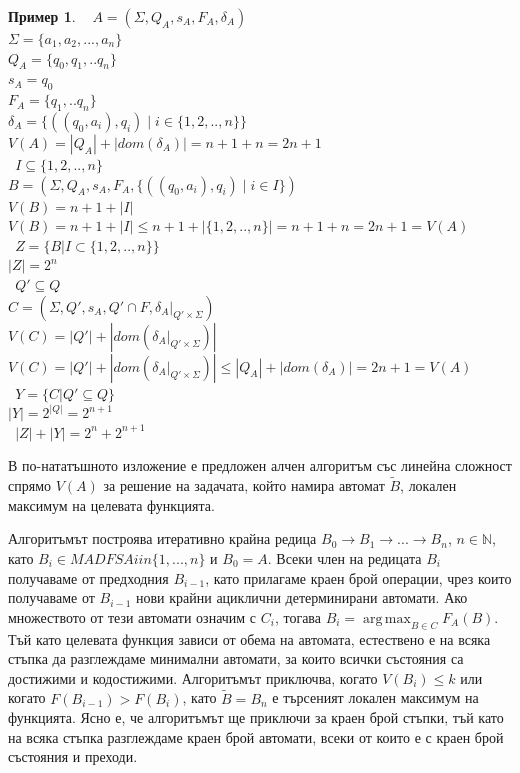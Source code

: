 \documentclass[a4paper,12pt]{article}
\newtheorem{example}{Пример}[section]
\DeclareMathOperator*{\argmax}{arg\,max}
\begin{document}
  \begin{example}
  \hfill \break\ \hfill \break
  $ A = (\Sigma, Q_A, s_A, F_A, \delta_A) $ \\
  $ \Sigma = \{ a_1, a_2, ..., a_n \} $ \\
  $ Q_A = \{ q_0, q_1, .. q_n \} $ \\
  $ s_A = q_0 $ \\
  $ F_A = \{ q_1, .. q_n \} $ \\
  $ \delta_A = \{ ((q_0, a_i), q_i)\;|\;i \in \{ 1, 2, .. , n \} \} $ \\
  $ V(A) = |Q_A| + | dom(\delta_A) | = n + 1 + n = 2n + 1 $ \\
  \hfill \break\
  $ I \subseteq \{ 1, 2, .. , n \} $ \\
  $ B = ( \Sigma, Q_A, s_A, F_A, \{ ((q_0, a_i), q_i)\;|\;i \in I \} ) $ \\
  $ V(B) = n + 1 + |I| $ \\
  $ V(B) = n + 1 + |I| \leq n + 1 + |\{ 1, 2, .. , n \}| = n + 1 + n = 2n + 1 = V(A) $ \\
  \hfill \break\
  $ Z = \{ B | I \subset \{ 1, 2, .. , n \} \} $ \\
  $ |Z| = 2^n $ \\
  \hfill \break\
  $ Q' \subseteq Q $ \\
  $ C = ( \Sigma, Q', s_A, Q' \cap F, \left.{\delta_A}\right|_{Q' \times \Sigma} ) $ \\
  $ V(C) = |Q'| + |dom(\left.{\delta_A}\right|_{Q' \times \Sigma})| $ \\
  $ V(C) = |Q'| + |dom(\left.{\delta_A}\right|_{Q' \times \Sigma})| \leq |Q_A| + |dom(\delta_A)| = 2n + 1 = V(A) $ \\
  \hfill \break\
  $ Y = \{ C | Q' \subseteq Q \} $ \\
  $ |Y| = 2^{|Q|} = 2 ^ {n + 1} $ \\
  \hfill \break\
  $ |Z| + |Y| = 2^n + 2 ^ {n+1} $
  \end{example}

\bigskip

  В по-нататъшното изложение е предложен алчен алгоритъм със линейна сложност спрямо $V(A)$ за решение на задачата, който намира автомат $\widetilde{B}$,
  локален максимум на целевата функцията.

  Алгоритъмът построява итеративно крайна редица $B_0 \rightarrow B_1 \rightarrow ... \rightarrow B_n$, $n \in \mathbb N$, като
  $B_i \in MADFSA i in \{1, ..., n\}$ и $B_0 = A$.
  Всеки член на редицата $B_i$ получаваме от предходния $B_{i-1}$, като
  прилагаме краен брой операции, чрез които получаваме от $B_{i-1}$ нови крайни ациклични детерминирани автомати. Ако множеството от тези автомати означим с $C_i$,
  тогава $B_i = \argmax_{B \in C} F_A(B)$. Тъй като целевата функция зависи от обема на автомата, естествено е на всяка стъпка да разглеждаме минимални
  автомати, за които всички състояния са достижими и кодостижими. Алгоритъмът приключва, когато $V(B_i) \leq k$ или когато $F(B_{i-1}) > F(B_i)$, като
  $\widetilde{B} = B_n$ е търсеният локален максимум на функцията. Ясно е, че алгоритъмът ще приключи за краен брой стъпки, тъй като на всяка стъпка разглеждаме
  краен брой автомати, всеки от които е с краен брой състояния и преходи.
\end{document}
